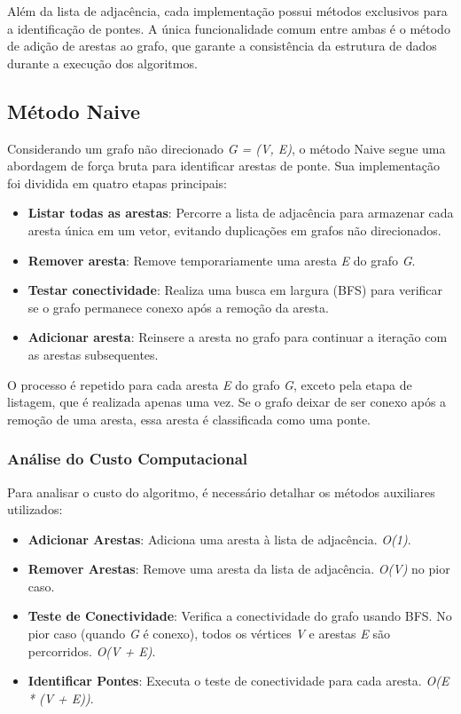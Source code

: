\documentclass{sbc2023}%
\begin{document}
Além da lista de adjacência, cada implementação possui métodos exclusivos para a identificação de pontes. A única funcionalidade comum entre ambas é o método de adição de arestas ao grafo, que garante a consistência da estrutura de dados durante a execução dos algoritmos.

\subsection{Método Naive}
Considerando um grafo não direcionado \textit{G = (V, E)}, o método Naive segue uma abordagem de força bruta para identificar arestas de ponte. Sua implementação foi dividida em quatro etapas principais:
\begin{itemize}
\item \textbf{Listar todas as arestas}: Percorre a lista de adjacência para armazenar cada aresta única em um vetor, evitando duplicações em grafos não direcionados.
\item \textbf{Remover aresta}: Remove temporariamente uma aresta \textit{E} do grafo \textit{G}.
\item \textbf{Testar conectividade}: Realiza uma busca em largura (BFS) para verificar se o grafo permanece conexo após a remoção da aresta.
\item \textbf{Adicionar aresta}: Reinsere a aresta no grafo para continuar a iteração com as arestas subsequentes.
\end{itemize}

O processo é repetido para cada aresta \textit{E} do grafo \textit{G}, exceto pela etapa de listagem, que é realizada apenas uma vez. Se o grafo deixar de ser conexo após a remoção de uma aresta, essa aresta é classificada como uma ponte.

\subsubsection{Análise do Custo Computacional}
Para analisar o custo do algoritmo, é necessário detalhar os métodos auxiliares utilizados:
\begin{itemize}
\item \textbf{Adicionar Arestas}: Adiciona uma aresta à lista de adjacência. \textit{O(1)}.
\item \textbf{Remover Arestas}: Remove uma aresta da lista de adjacência.  \textit{O(V)} no pior caso.
\item \textbf{Teste de Conectividade}: Verifica a conectividade do grafo usando BFS. No pior caso (quando \textit{G} é conexo), todos os vértices \textit{V} e arestas \textit{E} são percorridos.  \textit{O(V + E)}.
\item \textbf{Identificar Pontes}: Executa o teste de conectividade para cada aresta.  \textit{O(E * (V + E))}.
\end{itemize}
\end{document}

